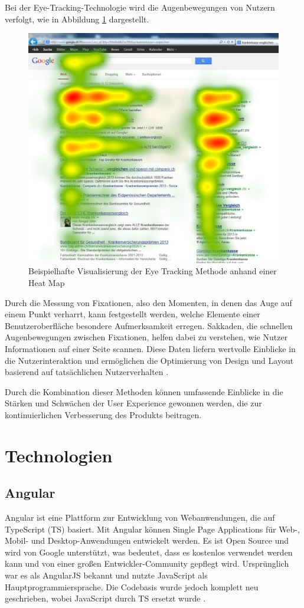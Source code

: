Bei der Eye-Tracking-Technologie wird die Augenbewegungen von Nutzern verfolgt, wie in Abbildung \ref{eye_tracking} dargestellt. 

\begin{figure}[h]
    \centering
    \includegraphics[clip,width=0.4\linewidth]{../prefix/image/Eye-Tracking-Google-Search-Heat-Map.jpg}
    \caption[Beispielhafte Visualisierung der Eye Tracking Methode anhand einer Heat Map]{Beispielhafte Visualisierung der Eye Tracking Methode anhand einer Heat Map \cite{image_eye_tracking}}
    \label{eye_tracking}
\end{figure}

Durch die Messung von Fixationen, also den Momenten, in denen das Auge auf einem Punkt verharrt, kann festgestellt werden, welche Elemente einer Benutzeroberfläche besondere Aufmerksamkeit erregen. 
Sakkaden, die schnellen Augenbewegungen zwischen Fixationen, helfen dabei zu verstehen, wie Nutzer Informationen auf einer Seite scannen. 
Diese Daten liefern wertvolle Einblicke in die Nutzerinteraktion und ermöglichen die Optimierung von Design und Layout basierend auf tatsächlichen Nutzerverhalten \cite[S.3 ff.]{eye_tracking}.

Durch die Kombination dieser Methoden können umfassende Einblicke in die Stärken und Schwächen der User Experience gewonnen werden, die zur kontinuierlichen Verbesserung des Produkts beitragen.

\section{Technologien}
\subsection{Angular}
Angular ist eine Plattform zur Entwicklung von Webanwendungen, die auf TypeScript (TS) basiert. 
Mit Angular können Single Page Applications für Web-, Mobil- und Desktop-Anwendungen entwickelt werden. 
Es ist Open Source und wird von Google unterstützt, was bedeutet, dass es kostenlos verwendet werden kann und von einer großen Entwickler-Community gepflegt wird. 
Ursprünglich war es als AngularJS bekannt und nutzte JavaScript als Hauptprogrammiersprache. Die Codebasis wurde jedoch komplett neu geschrieben, wobei JavaScript durch TS ersetzt wurde \cite{angular_arch}.

